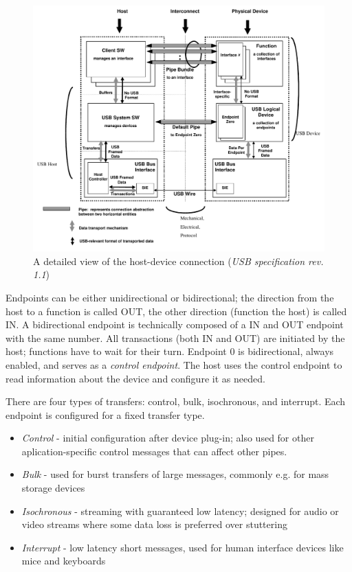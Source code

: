 \begin{figure}[H]
	\centering
	\includegraphics[width=\textwidth] {img/usb-structure.png}
	\caption{\label{fig:usb-logical}A detailed view of the host-device connection (\textit{USB specification rev. 1.1})}
\end{figure}

Endpoints can be either unidirectional or bidirectional; the direction from the host to a function is called OUT, the other direction (function the host) is called IN. A bidirectional endpoint is technically composed of a IN and OUT endpoint with the same number. All transactions (both IN and OUT) are initiated by the host; functions have to wait for their turn. Endpoint 0 is bidirectional, always enabled, and serves as a \textit{control endpoint}. The host uses the control endpoint to read information about the device and configure it as needed.

There are four types of transfers: control, bulk, isochronous, and interrupt. Each endpoint is configured for a fixed transfer type. 

\begin{itemize}
	\item \textit{Control} - initial configuration after device plug-in; also used for other aplication-specific control messages that can affect other pipes.
	\item \textit{Bulk} - used for burst transfers of large messages, commonly e.g. for mass storage devices
	\item \textit{Isochronous} - streaming with guaranteed low latency; designed for audio or video streams where some data loss is preferred over stuttering
	\item \textit{Interrupt} - low latency short messages, used for human interface devices like mice and keyboards
\end{itemize}


